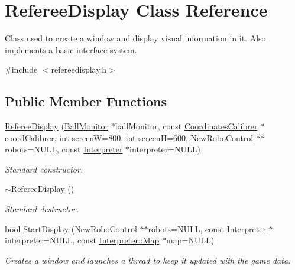 \hypertarget{classRefereeDisplay}{
\section{RefereeDisplay Class Reference}
\label{classRefereeDisplay}
}


Class used to create a window and display visual information in it. Also implements a basic interface system.  




{\ttfamily \#include $<$refereedisplay.h$>$}

\subsection*{Public Member Functions}
\begin{DoxyCompactItemize}
\item 
\hyperlink{classRefereeDisplay_a8f7d4872a24b44b96a36a5bbf991f5d2}{RefereeDisplay} (\hyperlink{classBallMonitor}{BallMonitor} $\ast$ballMonitor, const \hyperlink{classCoordinatesCalibrer}{CoordinatesCalibrer} $\ast$coordCalibrer, int screenW=800, int screenH=600, \hyperlink{classNewRoboControl}{NewRoboControl} $\ast$$\ast$robots=NULL, const \hyperlink{classInterpreter}{Interpreter} $\ast$interpreter=NULL)
\begin{DoxyCompactList}\small\item\em Standard constructor. \item\end{DoxyCompactList}\item 
\hyperlink{classRefereeDisplay_a5a9191c0d7f937df62ea9544d9e38f3b}{$\sim$RefereeDisplay} ()
\begin{DoxyCompactList}\small\item\em Standard destructor. \item\end{DoxyCompactList}\item 
bool \hyperlink{classRefereeDisplay_a6b789ef1ca73c72556cf5051a8a2b5a6}{StartDisplay} (\hyperlink{classNewRoboControl}{NewRoboControl} $\ast$$\ast$robots=NULL, const \hyperlink{classInterpreter}{Interpreter} $\ast$interpreter=NULL, const \hyperlink{classMatrix}{Interpreter::Map} $\ast$map=NULL)
\begin{DoxyCompactList}\small\item\em Creates a window and launches a thread to keep it updated with the game data. \item\end{DoxyCompactList}\item 

\end{DoxyCompactItemize}
